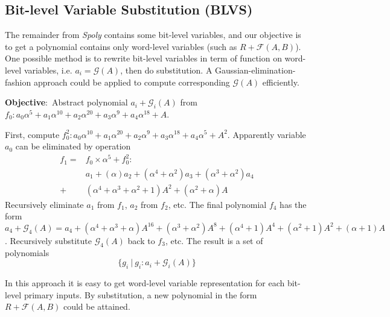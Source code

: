 \documentclass{acm_proc_article-sp}
\begin{document}
\subsection{Bit-level Variable Substitution (BLVS)}
The remainder from \emph{Spoly} contains some bit-level variables, and our objective is to get a polynomial contains only word-level variables
(such as $R+\mathcal{F}(A,B)$). One possible method is to rewrite bit-level variables in term of function on word-level
variables, i.e. $a_i = \mathcal{G}(A)$, then do substitution. A Gaussian-elimination-fashion approach could be applied to
compute corresponding $\mathcal{G}(A)$ efficiently.

\begin{Example}
{\bf Objective}:\ Abstract polynomial $a_i + \mathcal{G}_i(A)$ from $f_0: a_0\alpha^5+a_1\alpha^{10}+a_2\alpha^{20}+a_3\alpha^9+a_4\alpha^{18}+A$.

First, compute $f_0^2: a_0\alpha^{10}+a_1\alpha^{20}+a_2\alpha^{9}+a_3\alpha^{18}+a_4\alpha^{5}+A^2$. Apparently variable $a_0$ can be
eliminated by operation 
\begin{align}
f_1 =& f_0\times \alpha^5 + f_0^2: \nonumber\\
&a_1+(\alpha)a_2+(\alpha^4+\alpha^2)a_3+(\alpha^3+\alpha^2)a_4\nonumber\\
+&(\alpha^4+\alpha^3+\alpha^2+1)A^2+(\alpha^2+\alpha)A\nonumber
\end{align}
Recursively eliminate $a_1$ from $f_1$, $a_2$ from $f_2$, etc. The final polynomial $f_4$ has the form 
$a_4 + \mathcal{G}_4(A) = a_4+(\alpha^4+\alpha^3+\alpha)A^{16}+(\alpha^3+\alpha^2)A^8+(\alpha^4+1)A^4+(\alpha^2+1)A^2+(\alpha+1)A$. Recursively substitute
$\mathcal{G}_4(A)$ back to $f_3$, etc. The result is a set of polynomials
\begin{displaymath}
\{g_i\ | \ g_i: a_i + \mathcal{G}_i(A)\}
\end{displaymath}
\end{Example}
In this approach it is easy to get word-level variable representation for each bit-level primary inputs. By substitution, a new polynomial in the form $R+\mathcal{F}(A,B)$
could be attained.
\end{document}
